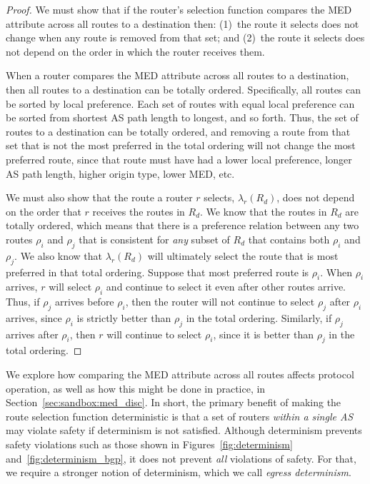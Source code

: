 \begin{proof}
We must show that if the router's selection function compares the MED
attribute across all routes to a destination then: (1)~the route it
selects does not change when any route is removed from that set; and
(2)~the route it selects does not depend on the order in which the
router receives them.

When a router compares the MED attribute across all routes to a
destination, then all routes to a destination can be totally ordered.
Specifically, all routes can be sorted by local preference.  Each set of
routes with equal local preference can be sorted from shortest AS path
length to longest, and so forth.  Thus, the set of routes to a
destination can 
be totally ordered, and removing a route from that set that is not the
most preferred in the total ordering will not change the most preferred
route, since that route must have had a lower local preference, longer
AS path length, higher origin type, lower MED, etc.  

We must also show that the route a router $r$ selects, $\lambda_r(R_d)$,
does not depend on the order that $r$ receives the routes in $R_d$.
We know that the routes in $R_d$ are totally ordered, which means that
there is a preference relation between any two routes $\rho_i$ and
$\rho_j$ that is consistent for {\em any} subset of $R_d$ that contains
both $\rho_i$ and $\rho_j$.  We also know that $\lambda_r(R_d)$ will
ultimately select the route that is most preferred in that total
ordering.  Suppose that most preferred route is $\rho_i$.  When $\rho_i$
arrives, $r$ will select $\rho_i$ and continue to select it even after
other routes arrive.  Thus, if $\rho_j$ arrives before $\rho_i$, then
the router will not continue to select $\rho_j$ after $\rho_i$ arrives,
since $\rho_i$ is strictly better than $\rho_j$ in the total ordering.
Similarly, if $\rho_j$ arrives after $\rho_i$, then $r$ will continue to
select $\rho_i$, since it is better than $\rho_j$ in the total ordering.
\end{proof}

We explore how comparing the MED attribute across all routes affects
protocol operation, as well as how this might be done in practice, in
Section~\ref{sec:sandbox:med_disc}.  In short, the primary benefit of
making the route selection function deterministic is that a set of
routers {\em 
within a single AS} may violate safety if determinism is not
satisfied.  Although determinism prevents safety violations such as
those shown in Figures~\ref{fig:determinism}
and~\ref{fig:determinism_bgp}, it does not prevent {\em all} violations
of safety.  For that, we require a stronger notion of determinism, which
we call {\em egress determinism}.


